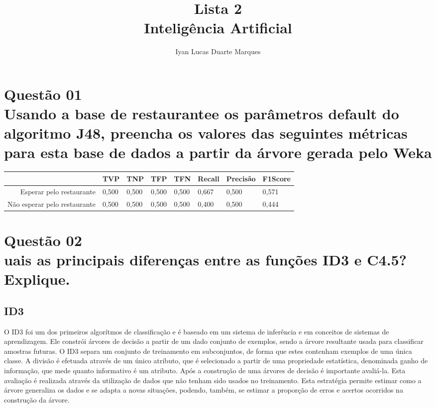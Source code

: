 \documentclass[12pt]{article}
\title{Lista 2\\ Inteligência Artificial}
\author{Iyan Lucas Duarte Marques\inst{1}}
\begin{document}
\maketitle

\section{Questão 01\\
Usando a base de restaurantee os parâmetros default do algoritmo J48, preencha os valores das seguintes métricas para esta base de dados a partir da árvore gerada pelo Weka
}
    \begin{center}
        \begin{tabular}{| r | l | l | l | l | l | l | l |}
        \hline
         &\textbf{TVP} & \textbf{TNP} & \textbf{TFP} & \textbf{TFN} & \textbf{Recall} & \textbf{Precisão} & \textbf{F1Score}\\ \hline
        Esperar pelo restaurante & 0,500 & 0,500 & 0,500 & 0,500 & 0,667 & 0,500 & 0,571 \\ \hline
        Não esperar pelo restaurante & 0,500 & 0,500 & 0,500 & 0,500 & 0,400 & 0,500 & 0,444 \\ \hline
        \end{tabular}
    \end{center}

\section{Questão 02\\
uais as principais diferenças entre as funções ID3 e C4.5? Explique.
}
\subsection{ID3}
O ID3 foi um dos primeiros algorítmos de classificação e é baseado em um sistema de inferência e em conceitos de sistemas de aprendizagem.
Ele constrói árvores de decisão a partir de um dado conjunto de exemplos, sendo a árvore resultante usada para classificar amostras futuras.
O ID3 separa um conjunto de treinamento em subconjuntos, de forma que estes contenham exemplos de uma única classe. A divisão é efetuada através de um único
atributo, que é selecionado a partir de uma propriedade estatística, denominada ganho de informação, que mede quanto informativo é um atributo.
Após a construção de uma árvores de decisão é importante avaliá-la. 
Esta avaliação é realizada através da utilização de dados que não tenham sido usados no treinamento.
Esta estratégia permite estimar como a árvore generaliza os dados e se adapta a novas situações, podendo, também, se estimar a proporção de erros e acertos ocorridos na
construção da árvore.
\end{document}
